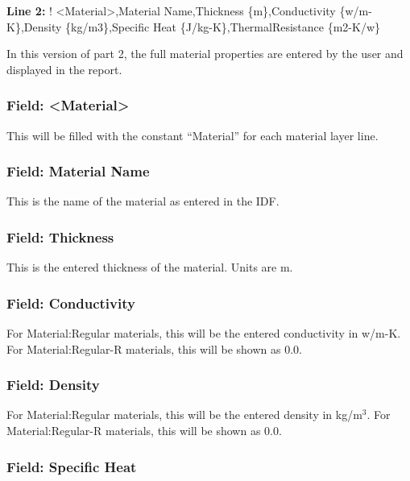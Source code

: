 \textbf{Line 2:} ! \textless{}Material\textgreater{},Material Name,Thickness \{m\},Conductivity \{w/m-K\},Density \{kg/m3\},Specific Heat \{J/kg-K\},ThermalResistance \{m2-K/w\}

In this version of part 2, the full material properties are entered by the user and displayed in the report.

\subsubsection{Field: \textless{}Material\textgreater{}}\label{field-material}

This will be filled with the constant ``Material'' for each material layer line.

\subsubsection{Field: Material Name}\label{field-material-name}

This is the name of the material as entered in the IDF.

\subsubsection{Field: Thickness}\label{field-thickness}

This is the entered thickness of the material. Units are m.

\subsubsection{Field: Conductivity}\label{field-conductivity}

For Material:Regular materials, this will be the entered conductivity in w/m-K. For Material:Regular-R materials, this will be shown as 0.0.

\subsubsection{Field: Density}\label{field-density}

For Material:Regular materials, this will be the entered density in kg/m\(^{3}\). For Material:Regular-R materials, this will be shown as 0.0.

\subsubsection{Field: Specific Heat}\label{field-specific-heat}

